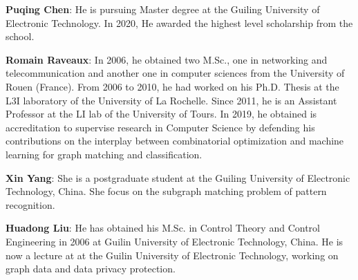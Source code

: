 \documentclass[times,onecolumn,final,authoryear]{article}
\theoremstyle{definition}
\begin{document}
\textbf{Puqing Chen}: He is pursuing Master degree at the Guiling University of Electronic Technology. In 2020, He awarded the highest level scholarship from the school.

\textbf{Romain Raveaux}: In 2006, he obtained two M.Sc., one in networking and telecommunication and another one in computer sciences from the University of Rouen (France). From 2006 to 2010, he had worked on his Ph.D. Thesis at the L3I laboratory of the University of La Rochelle. Since 2011, he is an Assistant Professor at the LI lab of the University of Tours. In 2019, he obtained is accreditation to supervise research in Computer Science by defending his contributions on the interplay between combinatorial optimization and machine learning for graph matching and classification.

\textbf{Xin Yang}: She is a postgraduate student at the Guiling University of Electronic Technology, China. She focus on the subgraph matching problem of pattern recognition.

\textbf{Huadong Liu}:  He has obtained his M.Sc. in Control Theory and Control Engineering in 2006 at Guilin University of Electronic Technology, China. He is now a lecture at  at the Guilin University of Electronic Technology, working on graph data and data privacy protection.
\end{document}

